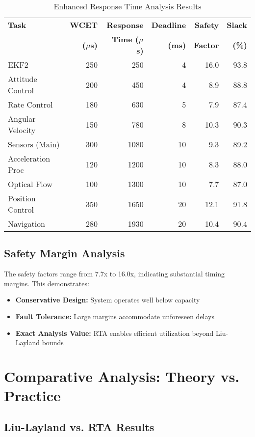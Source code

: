 \documentclass[12pt,a4paper]{article}
\begin{document}
\begin{table}[H]
\centering
\caption{Enhanced Response Time Analysis Results}
\begin{tabular}{lrrrrr}
\toprule
\textbf{Task} & \textbf{WCET} & \textbf{Response} & \textbf{Deadline} & \textbf{Safety} & \textbf{Slack} \\
& \textbf{($\mu$s)} & \textbf{Time ($\mu$s)} & \textbf{(ms)} & \textbf{Factor} & \textbf{(\%)} \\
\midrule
EKF2 & 250 & 250 & 4 & 16.0 & 93.8 \\
Attitude Control & 200 & 450 & 4 & 8.9 & 88.8 \\
Rate Control & 180 & 630 & 5 & 7.9 & 87.4 \\
Angular Velocity & 150 & 780 & 8 & 10.3 & 90.3 \\
Sensors (Main) & 300 & 1080 & 10 & 9.3 & 89.2 \\
Acceleration Proc & 120 & 1200 & 10 & 8.3 & 88.0 \\
Optical Flow & 100 & 1300 & 10 & 7.7 & 87.0 \\
Position Control & 350 & 1650 & 20 & 12.1 & 91.8 \\
Navigation & 280 & 1930 & 20 & 10.4 & 90.4 \\
\bottomrule
\end{tabular}
\end{table}

\subsection{Safety Margin Analysis}

The safety factors range from 7.7x to 16.0x, indicating substantial timing margins. This demonstrates:

\begin{itemize}
\item \textbf{Conservative Design:} System operates well below capacity
\item \textbf{Fault Tolerance:} Large margins accommodate unforeseen delays
\item \textbf{Exact Analysis Value:} RTA enables efficient utilization beyond Liu-Layland bounds
\end{itemize}

\section{Comparative Analysis: Theory vs. Practice}

\subsection{Liu-Layland vs. RTA Results}
\end{document}
